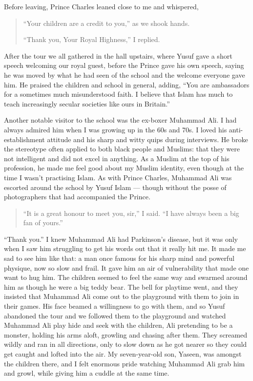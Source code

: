 \documentclass[12pt]{memoir}
\def\–{-\hskip0pt}
\begin{document}
Before leaving, Prince Charles leaned close to me and whispered,

\begin{quote}
“Your children are a credit to you,” as we shook hands.

“Thank you, Your Royal Highness,” I replied.
\end{quote}

After the tour we all gathered in the hall upstairs,
where Yusuf gave a short speech welcoming our royal guest,
before the Prince gave his own speech,
saying he was moved by what he had seen of the school
and the welcome everyone gave him.
He praised the children and school in general, adding,
“You are ambassadors for a sometimes much misunderstood faith.
I believe that Islam has much to teach increasingly secular societies
like ours in Britain.”

Another notable visitor to the school was the ex-boxer Muhammad Ali.
I had always admired him when I was growing up in the 60s and 70s.
I loved his anti\–establishment attitude
and his sharp and witty quips during interviews.
He broke the stereotype often applied to both black people and Muslims:
that they were not intelligent and did not excel in anything.
As a Muslim at the top of his profession,
he made me feel good about my Muslim identity,
even though at the time I wasn’t practising Islam.
As with Prince Charles, Muhammad Ali was escorted around the school
by Yusuf Islam — though without the posse of photographers
that had accompanied the Prince.

\begin{quote}
“It is a great honour to meet you, sir,” I said.
“I have always been a big fan of yours.”
\end{quote}

“Thank you.” I knew Muhammad Ali had Parkinson’s disease,
but it was only when I saw him struggling to get his words out
that it really hit me.
It made me sad to see him like that: a man once famous for his sharp mind
and powerful physique, now so slow and frail.
It gave him an air of vulnerability that made one want to hug him.
The children seemed to feel the same way and swarmed around him
as though he were a big teddy bear.
The bell for playtime went, and they insisted that Muhammad Ali
come out to the playground with them to join in their games.
His face beamed a willingness to go with them,
and so Yusuf abandoned the tour and we followed them to the playground
and watched Muhammad Ali play hide and seek with the children,
Ali pretending to be a monster, holding his arms aloft,
growling and chasing after them.
They screamed wildly and ran in all directions, only to slow down
as he got nearer so they could get caught and lofted into the air.
My seven-year-old son, Yaseen, was amongst the children there,
and I felt enormous pride watching Muhammad Ali grab him and growl,
while giving him a cuddle at the same time.
\end{document}
